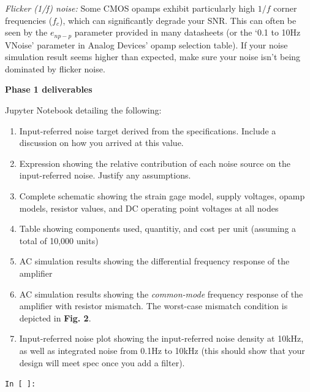 \documentclass[11pt]{article}
\begin{document}
\vspace{1em}
\textit{Flicker (1/f) noise:} Some CMOS opamps exhibit particularly high $1/f$ corner frequencies ($f_c$), which can significantly degrade your SNR. This can often be seen by the $e_{np-p}$ parameter provided in many datasheets (or the `0.1 to 10Hz VNoise' parameter in Analog Devices' opamp selection table). If your noise simulation result seems higher than expected, make sure your noise isn't being dominated by flicker noise.

\vspace{2em}
\textbf{\Large Phase 1 deliverables}

Jupyter Notebook detailing the following:

\begin{enumerate}
    \setlength{\itemsep}{2pt}
    \item Input-referred noise target derived from the specifications. Include a discussion on how you arrived at this value.
    \item Expression showing the relative contribution of each noise source on the input-referred noise. Justify any assumptions.
    \item Complete schematic showing the strain gage model, supply voltages, opamp models, resistor values, and DC operating point voltages at all nodes
    \item Table showing components used, quantitiy, and cost per unit (assuming a total of 10,000 units)
    \item AC simulation results showing the differential frequency response of the amplifier
    \item AC simulation results showing the \textit{common-mode} frequency response of the amplifier with resistor mismatch. The worst-case mismatch condition is depicted in \textbf{Fig. 2}.
    \item Input-referred noise plot showing the input-referred noise density at 10kHz, as well as integrated noise from 0.1Hz to 10kHz (this should show that your design will meet spec once you add a filter).
\end{enumerate}

\vspace{2em}
\noindent
\texttt{\color{blue!80!black}In [~]:} \framebox[0.9\textwidth]{\rule{0pt}{15pt}}
\end{document}
